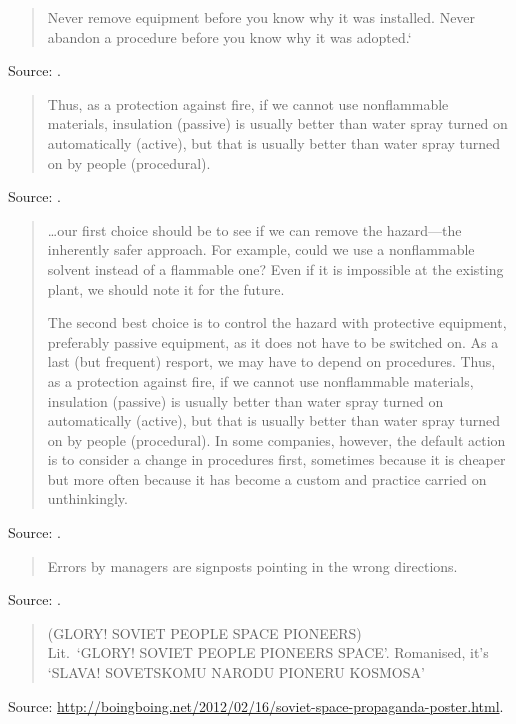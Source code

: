 \documentclass[a4paper]{article}
\begin{document}
\begin{quote}
	Never remove equipment before you know why it was installed.  Never abandon a procedure before
you know why it was adopted.`
\end{quote}
Source: \citet[p.~22]{Kletz1993}.
\medskip

\begin{quote}
Thus, as a protection against fire, if we cannot use nonflammable materials, insulation (passive)
is usually better than water spray turned on automatically (active), but that is usually better
than water spray turned on by people (procedural).
\end{quote}
Source: \citet[p.~208]{Kletz2003}.
\medskip

\begin{quotation}
	\ldots our first choice should be to see if we can remove the hazard---the inherently safer
approach.  For example, could we use a nonflammable solvent instead of a flammable one?  Even if it
is impossible at the existing plant, we should note it for the future.

The second best choice is to control the hazard with protective equipment, preferably passive
equipment, as it does not have to be switched on.  As a last (but frequent) resport, we may have to
depend on procedures.  Thus, as a protection against fire, if we cannot use nonflammable materials,
insulation (passive) is usually better than water spray turned on automatically (active), but that
is usually better than water spray turned on by people (procedural).  In some companies, however,
the default action is to consider a change in procedures first, sometimes because it is cheaper but
more often because it has become a custom and practice carried on unthinkingly.
\end{quotation}
Source: \citet[p.~208]{Kletz2003}.
\medskip

\begin{quote}
	Errors by managers are signposts pointing in the wrong directions.
\end{quote}
Source: \citet[p.~207]{Kletz2003}.
\medskip

\begin{quote}
(GLORY! SOVIET PEOPLE SPACE PIONEERS) \\
Lit.\ `GLORY!  SOVIET PEOPLE PIONEERS SPACE'.  Romanised, it's `SLAVA!  SOVETSKOMU NARODU PIONERU
KOSMOSA'
\end{quote}
Source: \url{http://boingboing.net/2012/02/16/soviet-space-propaganda-poster.html}.
\medskip
\end{document}
